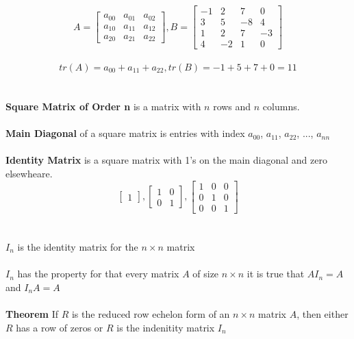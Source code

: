 \documentclass[a4paper, 12pt]{article}
\begin{document}
\\
\\
\[
A = \left[{
    \begin{array}{ccc}
    a_{00} & a_{01} & a_{02} \\
    a_{10} & a_{11} & a_{12} \\
    a_{20} & a_{21} & a_{22}
    \end{array}
}
\right]
,
B = \left[{
    \begin{array}{cccc}
    -1 &  2 &  7 &  0 \\
    3  &  5 & -8 &  4 \\
    1  &  2 &  7 & -3 \\
    4  & -2 &  1 &  0
    \end{array} 
}\right]
\]
\\
\[
tr(A) = a_{00} + a_{11} + a_{22}, 
tr(B) = -1 + 5 + 7 + 0 = 11
\]
\\
\\
\textbf{Square Matrix of Order n} is a matrix with $n$ rows and $n$ columns.
\\
\\
\textbf{Main Diagonal} of a square matrix is entries with index 
$a_{00}$, $a_{11}$, $a_{22}$, ..., $a_{nn}$
\\
\\
\textbf{Identity Matrix} is a square matrix with 1's on the main 
diagonal and zero elsewheare.
\[
\left[{
\begin{array}{c}
1
\end{array}
} \right]
,
\left[{
\begin{array}{cc}
1 & 0 \\
0 & 1 
\end{array}
} \right]
,
\left[{
\begin{array}{ccc}
1 & 0 & 0\\
0 & 1 & 0\\
0 & 0 & 1
\end{array}
} \right]
\] 
\\
\\
\textbf{$I_n$} is the identity matrix for the $n \times n$ matrix
\\
\\
$I_n$ has the property for that every matrix $A$ of size $n \times n$ 
it is true that $A I_n = A$  and $I_n A = A$
\\
\\
\textbf{Theorem} If $R$ is the reduced row echelon form of an $n \times n$
matrix $A$, then either $R$ has a row of zeros or $R$ is the indenitity
matrix $I_n$
\\
\end{document}

